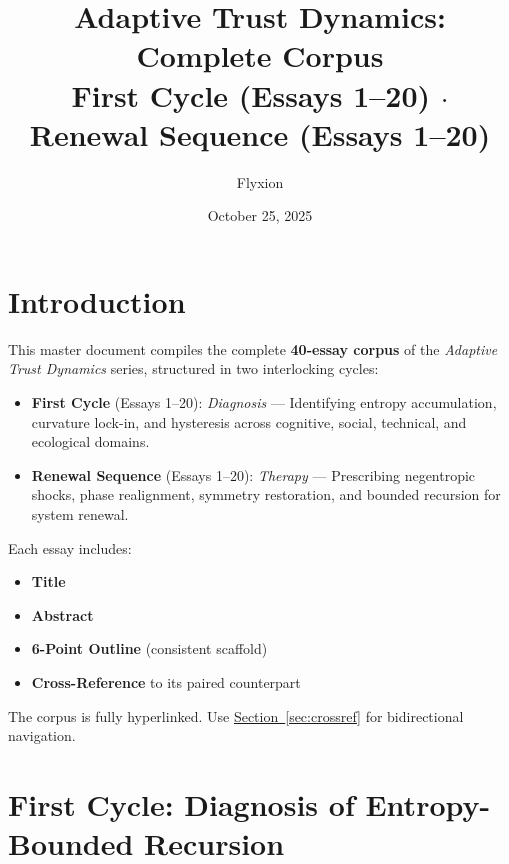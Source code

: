 \documentclass[12pt,a4paper]{article}
\title{\Huge\textbf{Adaptive Trust Dynamics: Complete Corpus}\\[0.5em]
\Large First Cycle (Essays 1--20) $\cdot$ Renewal Sequence (Essays 1--20)}
\author{Flyxion}
\date{October 25, 2025}
\begin{document}
\maketitle
\tableofcontents
\newpage

\section{Introduction}
This master document compiles the complete \textbf{40-essay corpus} of the \textit{Adaptive Trust Dynamics} series, structured in two interlocking cycles:

\begin{itemize}
\item \textbf{First Cycle} (Essays 1--20): \emph{Diagnosis} --- Identifying entropy accumulation, curvature lock-in, and hysteresis across cognitive, social, technical, and ecological domains.
\item \textbf{Renewal Sequence} (Essays 1--20): \emph{Therapy} --- Prescribing negentropic shocks, phase realignment, symmetry restoration, and bounded recursion for system renewal.
\end{itemize}

Each essay includes:
\begin{itemize}
\item \textbf{Title}
\item \textbf{Abstract}
\item \textbf{6-Point Outline} (consistent scaffold)
\item \textbf{Cross-Reference} to its paired counterpart
\end{itemize}

The corpus is fully hyperlinked. Use \hyperref[sec:crossref]{Section~\ref{sec:crossref}} for bidirectional navigation.

\section{First Cycle: Diagnosis of Entropy-Bounded Recursion}
\label{sec:firstcycle}

\end{document}

